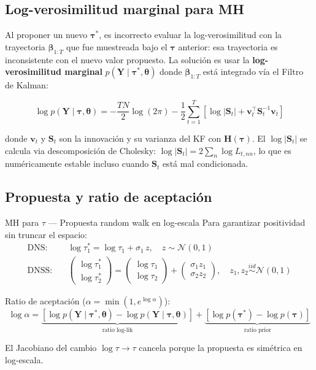 \documentclass[12pt, a4paper]{article}
\theoremstyle{plain}
\theoremstyle{definition}
\theoremstyle{remark}
\newcommand{\bbet}{\bm{\beta}}
\newcommand{\btau}{\bm{\tau}}
\newcommand{\bY}{\mathbf{Y}}
\newcommand{\bH}{\mathbf{H}}
\newcommand{\bS}{\mathbf{S}}
\newcommand{\N}{\mathcal{N}}
\begin{document}
\subsection{Log-verosimilitud marginal para MH}

Al proponer un nuevo $\btau^*$, es incorrecto evaluar la log-verosimilitud
con la trayectoria $\bbet_{1:T}$ que fue muestreada bajo el $\btau$ anterior:
esa trayectoria es inconsistente con el nuevo valor propuesto.
La solución es usar la \textbf{log-verosimilitud marginal} $p(\bY \mid \btau^*, \bm{\theta})$
donde $\bbet_{1:T}$ está integrado vía el Filtro de Kalman:

\begin{equation}
  \log p(\bY \mid \btau, \bm{\theta})
  = -\frac{TN}{2}\log(2\pi)
    - \frac{1}{2}\sum_{t=1}^T \left[\log|\bS_t| + \bm{v}_t^\top \bS_t^{-1} \bm{v}_t\right]
  \label{eq:marginal_loglik}
\end{equation}

donde $\bm{v}_t$ y $\bS_t$ son la innovación y su varianza del KF con $\bH(\btau)$.
El $\log|\bS_t|$ se calcula via descomposición de Cholesky:
$\log|\bS_t| = 2\sum_n \log L_{t,nn}$, lo que es numéricamente estable
incluso cuando $\bS_t$ está mal condicionada.

\subsection{Propuesta y ratio de aceptación}

\begin{teoremabox}{MH para $\tau$ — Propuesta random walk en log-escala}
Para garantizar positividad sin truncar el espacio:
\begin{align}
  \text{DNS:} &\quad \log\tau_1^* = \log\tau_1 + \sigma_1\,z, \quad z \sim \N(0,1) \\
  \text{DNSS:} &\quad
    \begin{pmatrix}\log\tau_1^*\\\log\tau_2^*\end{pmatrix} =
    \begin{pmatrix}\log\tau_1\\\log\tau_2\end{pmatrix} +
    \begin{pmatrix}\sigma_1 z_1\\\sigma_2 z_2\end{pmatrix}, \quad
    z_1, z_2 \overset{iid}{\sim} \N(0,1)
\end{align}

Ratio de aceptación ($\alpha = \min(1, e^{\log\alpha})$):
\begin{equation}
  \log\alpha = \underbrace{
    \left[\log p(\bY \mid \btau^*, \bm{\theta}) - \log p(\bY \mid \btau, \bm{\theta})\right]
  }_{\text{ratio log-lik}} +
  \underbrace{
    \left[\log p(\btau^*) - \log p(\btau)\right]
  }_{\text{ratio prior}}
  \label{eq:mh_ratio}
\end{equation}

El Jacobiano del cambio $\log\tau \to \tau$ cancela porque la propuesta
es simétrica en log-escala.
\end{teoremabox}
\end{document}
